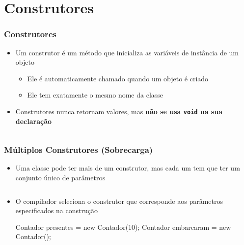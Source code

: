 \documentclass[xcolor={dvipsnames,table},aspectratio=169]{beamer}
\begin{document}
\section{Construtores}

\begin{frame}[fragile]\frametitle{Construtores}
\begin{itemize}
	\item Um construtor é um método que inicializa as variáveis de instância de um objeto
	\begin{itemize}
		\item Ele é automaticamente chamado quando um objeto é criado
		\item Ele tem exatamente o mesmo nome da classe
	\end{itemize}
	\item Construtores nunca retornam valores, mas \textbf{não se usa \texttt{void} na sua declaração}
\end{itemize}
{\scriptsize\inputminted[bgcolor=cyan!10]{java}{src/contagem1/Contador.java}}
\end{frame}

\begin{frame}[fragile]\frametitle{Múltiplos Construtores (Sobrecarga)}
\begin{itemize}
	\item Uma classe pode ter mais de um construtor, mas cada um tem que ter um conjunto único de parâmetros
{\tiny\inputminted[bgcolor=cyan!10]{java}{src/contagem2/Contador.java}}
	\item O compilador seleciona o construtor que corresponde aos parâmetros especificados na construção
{\tiny
\begin{javacode}
Contador presentes = new Contador(10);
Contador embarcaram = new Contador();
\end{javacode}
}
\end{itemize}
\end{frame}
\end{document}
